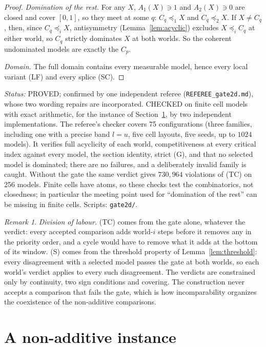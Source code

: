 \documentclass[11pt]{article}
\theoremstyle{definition}\newtheorem{definition}[theorem]{Definition}
\theoremstyle{remark}\newtheorem{remark}[theorem]{Remark}
\newcommand{\status}[1]{\par\noindent\emph{Status:} #1\par}
\begin{document}
\begin{proof}
\emph{Domination of the rest.} For any $X$, $A_1(X)\ni1$ and $A_2(X)\ni0$ are
closed and cover $[0,1]$, so they meet at some $q$: $C_q\preceq_1X$ and
$C_q\preceq_2X$. If $X\ne C_q$, then, since $C_q\preceq_iX$, antisymmetry
(Lemma~\ref{lem:acyclic}) excludes $X\preceq_iC_q$ at either world, so $C_q$
strictly dominates $X$ at both worlds. So the coherent undominated models are
exactly the $C_p$.

\emph{Domain.} The full domain contains every measurable model, hence every
local variant (LF) and every splice (SC).
\end{proof}

\status{PROVED; confirmed by one independent referee
(\texttt{REFEREE\_gate2d.md}), whose two wording repairs are incorporated.
CHECKED on finite cell models with exact arithmetic, for the instance of
Section~\ref{sec:instance}, by two independent implementations. The referee's
checker covers 75 configurations (three families, including one with a precise
band $l=u$, five cell layouts, five seeds, up to $1024$ models). It verifies
full acyclicity of each world, competitiveness at every critical index against
every model, the section identity, strict (G), and that no selected model is
dominated; there are no failures, and a deliberately invalid family is caught.
Without the gate the same verdict gives $730{,}964$ violations of (TC) on 256
models. Finite cells have atoms, so these checks test the combinatorics, not
closedness; in particular the meeting point used for ``domination of the
rest'' can be missing in finite cells. Scripts: \texttt{gate2d/}.}

\begin{remark}\label{rem:roles}
\emph{Division of labour.} (TC) comes from the gate alone, whatever the
verdict: every accepted comparison adds world-$i$ steps before it removes any
in the priority order, and a cycle would have to remove what it adds at the
bottom of its window. (S) comes from the threshold property of
Lemma~\ref{lem:threshold}: every disagreement with a selected model passes the
gate at both worlds, so each world's verdict applies to every such
disagreement. The verdicts are constrained only by continuity, two sign
conditions and covering. The construction never accepts a comparison that fails the gate,
which is how incomparability organizes the coexistence of the non-additive
comparisons.
\end{remark}

\section{A non-additive instance}\label{sec:instance}
\end{document}
